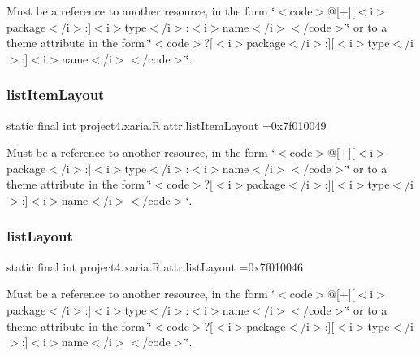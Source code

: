 Must be a reference to another resource, in the form \char`\"{}$<$code$>$@\mbox{[}+\mbox{]}\mbox{[}$<$i$>$package$<$/i$>$\+:\mbox{]}$<$i$>$type$<$/i$>$\+:$<$i$>$name$<$/i$>$$<$/code$>$\char`\"{} or to a theme attribute in the form \char`\"{}$<$code$>$?\mbox{[}$<$i$>$package$<$/i$>$\+:\mbox{]}\mbox{[}$<$i$>$type$<$/i$>$\+:\mbox{]}$<$i$>$name$<$/i$>$$<$/code$>$\char`\"{}. \mbox{\label{classproject4_1_1xaria_1_1R_1_1attr_aaff15f9ea72df9f25ec6cb31f6f891eb}} 
\subsubsection{\texorpdfstring{list\+Item\+Layout}{listItemLayout}}
{\footnotesize\ttfamily static final int project4.\+xaria.\+R.\+attr.\+list\+Item\+Layout =0x7f010049\hspace{0.3cm}{\ttfamily [static]}}

Must be a reference to another resource, in the form \char`\"{}$<$code$>$@\mbox{[}+\mbox{]}\mbox{[}$<$i$>$package$<$/i$>$\+:\mbox{]}$<$i$>$type$<$/i$>$\+:$<$i$>$name$<$/i$>$$<$/code$>$\char`\"{} or to a theme attribute in the form \char`\"{}$<$code$>$?\mbox{[}$<$i$>$package$<$/i$>$\+:\mbox{]}\mbox{[}$<$i$>$type$<$/i$>$\+:\mbox{]}$<$i$>$name$<$/i$>$$<$/code$>$\char`\"{}. \mbox{\label{classproject4_1_1xaria_1_1R_1_1attr_a336b946d82b58509bc72ccc23ffce822}} 
\subsubsection{\texorpdfstring{list\+Layout}{listLayout}}
{\footnotesize\ttfamily static final int project4.\+xaria.\+R.\+attr.\+list\+Layout =0x7f010046\hspace{0.3cm}{\ttfamily [static]}}

Must be a reference to another resource, in the form \char`\"{}$<$code$>$@\mbox{[}+\mbox{]}\mbox{[}$<$i$>$package$<$/i$>$\+:\mbox{]}$<$i$>$type$<$/i$>$\+:$<$i$>$name$<$/i$>$$<$/code$>$\char`\"{} or to a theme attribute in the form \char`\"{}$<$code$>$?\mbox{[}$<$i$>$package$<$/i$>$\+:\mbox{]}\mbox{[}$<$i$>$type$<$/i$>$\+:\mbox{]}$<$i$>$name$<$/i$>$$<$/code$>$\char`\"{}. \mbox{\label{classproject4_1_1xaria_1_1R_1_1attr_a77f676fad01374f9af35981125b8b457}} 
